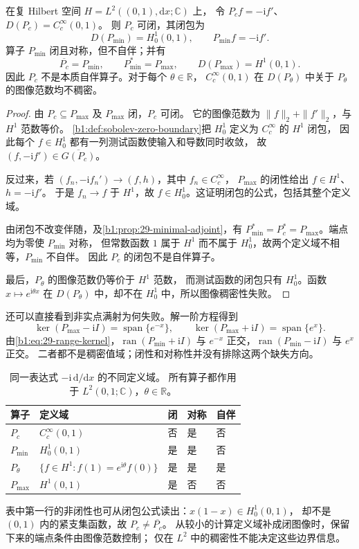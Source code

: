 \begin{theorem}[测试函数微分算子的闭包]
\label{b1:thm:29-minimal-derivative}
在复 Hilbert 空间 \(H=L^2((0,1),\mathrm dx;\mathbb C)\) 上，
令 \(P_cf=-\mathrm if'\)、\(D(P_c)=C_c^\infty(0,1)\)。
则 \(P_c\) 可闭，其闭包为
\[
 D(P_{\min})=H_0^1(0,1),\qquad P_{\min}f=-\mathrm if'.
\]
算子 \(P_{\min}\) 闭且对称，但不自伴；并有
\[
 \overline{P_c}=P_{\min},\qquad P_{\min}^*=P_{\max},
 \qquad D(P_{\max})=H^1(0,1).
\]
因此 \(P_c\) 不是本质自伴算子。对于每个 \(\theta\in\mathbb R\)，
\(C_c^\infty(0,1)\) 在 \(D(P_\theta)\) 中关于 \(P_\theta\) 的图像范数均不稠密。
\end{theorem}
\begin{proof}
由 \(P_c\subseteq P_{\max}\) 及 \(P_{\max}\) 闭，\(P_c\) 可闭。
它的图像范数为 \(\|f\|_2+\|f'\|_2\)，与 \(H^1\) 范数等价。
\cref{b1:def:sobolev-zero-boundary}把 \(H_0^1\) 定义为 \(C_c^\infty\) 的 \(H^1\) 闭包，
因此每个 \(f\in H_0^1\) 都有一列测试函数使输入和导数同时收敛，
故 \((f,-\mathrm if')\in\overline{G(P_c)}\)。

反过来，若 \((f_n,-\mathrm if_n')\to(f,h)\)，其中 \(f_n\in C_c^\infty\)，
\(P_{\max}\) 的闭性给出 \(f\in H^1\)、\(h=-\mathrm if'\)。
于是 \(f_n\to f\) 于 \(H^1\)，故 \(f\in H_0^1\)。这证明闭包的公式，包括其整个定义域。

由闭包不改变伴随，及\cref{b1:prop:29-minimal-adjoint}，有
\(P_{\min}^*=P_c^*=P_{\max}\)。端点均为零使 \(P_{\min}\) 对称，
但常数函数 \(1\) 属于 \(H^1\) 而不属于 \(H_0^1\)，故两个定义域不相等，\(P_{\min}\) 不自伴。
因此 \(P_c\) 的闭包不是自伴算子。

最后，\(P_\theta\) 的图像范数仍等价于 \(H^1\) 范数，
而测试函数的闭包只有 \(H_0^1\)。函数 \(x\mapsto e^{\mathrm i\theta x}\)
在 \(D(P_\theta)\) 中，却不在 \(H_0^1\) 中，所以图像稠密性失败。
\end{proof}

还可以直接看到非实点满射为何失败。解一阶方程得到
\[
 \ker(P_{\max}-\mathrm iI)=\operatorname{span}\{e^{-x}\},\qquad
 \ker(P_{\max}+\mathrm iI)=\operatorname{span}\{e^x\}.
\]
由\eqref{b1:eq:29-range-kernel}，\(\operatorname{ran}(P_{\min}+\mathrm iI)\)
与 \(e^{-x}\) 正交，\(\operatorname{ran}(P_{\min}-\mathrm iI)\) 与 \(e^x\) 正交。
二者都不是稠密值域；闭性和对称性并没有排除这两个缺失方向。

\begin{table}[htbp]
\centering
\small
\caption[一阶微分算子的定义域比较]{同一表达式 \(-\mathrm i\,\mathrm d/\mathrm dx\) 的不同定义域。
所有算子都作用于 \(L^2(0,1;\mathbb C)\)，\(\theta\in\mathbb R\)。}
\label{b1:tab:29-derivative-domains}
\begin{tabular}{lllll}
\toprule
算子 & 定义域 & 闭 & 对称 & 自伴\\
\midrule
\(P_c\) & \(C_c^\infty(0,1)\) & 否 & 是 & 否\\
\(P_{\min}\) & \(H_0^1(0,1)\) & 是 & 是 & 否\\
\(P_\theta\) & \(\{f\in H^1:f(1)=e^{\mathrm i\theta}f(0)\}\) & 是 & 是 & 是\\
\(P_{\max}\) & \(H^1(0,1)\) & 是 & 否 & 否\\
\bottomrule
\end{tabular}
\end{table}

表中第一行的非闭性也可从闭包公式读出：\(x(1-x)\in H_0^1(0,1)\)，
却不是 \((0,1)\) 内的紧支集函数，故 \(P_c\ne\overline{P_c}\)。
从较小的计算定义域补成闭图像时，保留下来的端点条件由图像范数控制；
仅在 \(L^2\) 中的稠密性不能决定这些边界信息。
